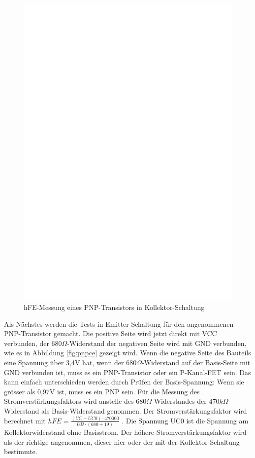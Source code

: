 \begin{figure}[H]
\centering
\includegraphics[]{../FIG/PNPcc.eps}
\caption{hFE-Messung eines PNP-Transistors in Kollektor-Schaltung}
\label{fig:pnpcc}
\end{figure}

Als Nächstes werden die Tests in Emitter-Schaltung für den angenommenen PNP-Transistor gemacht.
Die positive Seite wird jetzt direkt mit VCC verbunden, der \(680\Omega\)-Widerstand der negativen Seite wird 
mit GND verbunden, wie es in Abbildung \ref{fig:pnpce} gezeigt wird. 
Wenn die negative Seite des Bauteils eine Spannung über 3,4V hat, wenn der \(680\Omega\)-Widerstand auf der Basis-Seite mit
GND verbunden ist, muss es ein PNP-Transistor oder ein P-Kanal-FET sein.
Das kann einfach unterschieden werden durch Prüfen der Basis-Spannung: Wenn sie grösser als 0,97V ist, muss es ein PNP sein.
Für die Messung des Stromverstärkungsfaktors wird anstelle des \(680\Omega\)-Widerstandes der
 \(470k\Omega\)-Widerstand als Basis-Widerstand genommen.
Der Stromverstärkungsfaktor wird berechnet mit \(hFE = \frac{(UC-UC0) \cdot 470000}{UB \cdot (680+19)}\) .
Die Spannung UC0 ist die Spannung am Kollektorwiderstand ohne Basisstrom.
Der höhere Stromverstärkungsfaktor wird als der richtige angenommen, dieser hier oder der
mit der Kollektor-Schaltung bestimmte.



